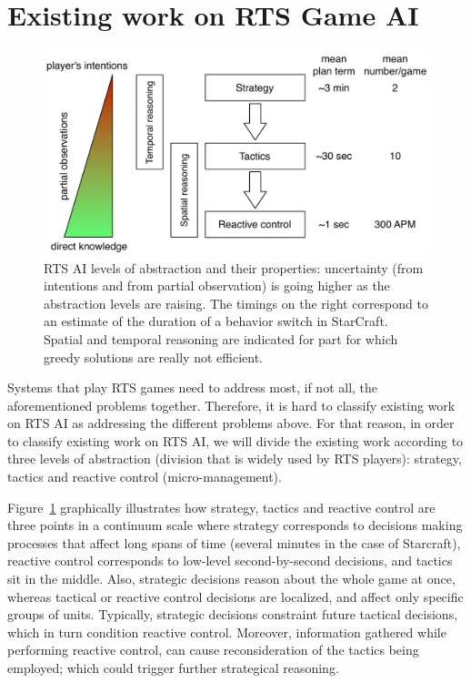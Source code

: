 \documentclass[journal]{IEEEtran}
\begin{document}
\section{Existing work on RTS Game AI}\label{sec:review}

\begin{figure}
    \centering
    \includegraphics[width=0.9\columnwidth]{figures/levels_abstraction.pdf}
    \caption{RTS AI levels of abstraction and their properties: uncertainty (from intentions and from partial observation) is going higher as the abstraction levels are raising. The timings on the right correspond to an estimate of the duration of a behavior switch in StarCraft. Spatial and temporal reasoning are indicated for part for which greedy solutions are really not efficient.}
    \label{fig:levels-abstraction}
\end{figure}

Systems that play RTS games need to address most, if not all, the aforementioned problems together. Therefore, it is hard to classify existing work on RTS AI as addressing the different problems above. For that reason, in order to classify existing work on RTS AI, we will divide the existing work according to three levels of abstraction (division that is widely used by RTS players): strategy, tactics and reactive control (micro-management). 

Figure~\ref{fig:levels-abstraction} graphically illustrates how strategy, tactics and reactive control are three points in a continuum scale where strategy corresponds to decisions making processes that affect long spans of time (several minutes in the case of Starcraft), reactive control corresponds to low-level second-by-second decisions, and tactics sit in the middle. Also, strategic decisions reason about the whole game at once, whereas tactical or reactive control decisions are localized, and affect only specific groups of units. Typically, strategic decisions constraint future tactical decisions, which in turn condition reactive control. Moreover, information gathered while performing reactive control, can cause reconsideration of the tactics being employed; which could trigger further strategical reasoning.
\end{document}
